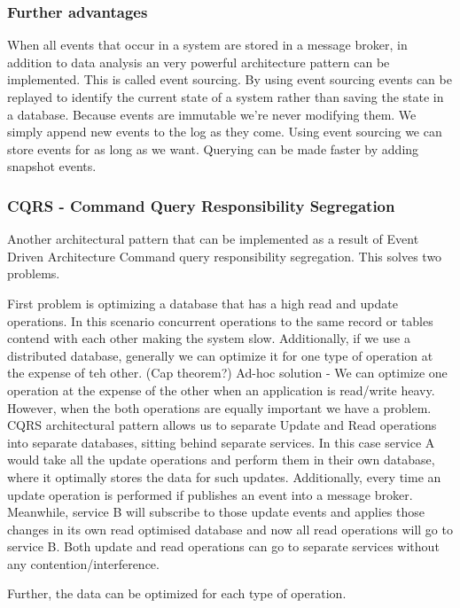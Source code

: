 \documentclass[a4paper, 11pt]{book}
\begin{document}
    \subsubsection{Further advantages}
    When all events that occur in a system are stored in a message broker, in addition to data analysis an very powerful architecture pattern can be implemented.
    This is called event sourcing.
    By using event sourcing events can be replayed to identify the current state of a system rather than saving the state in a database.
    Because events are immutable we're never modifying them.
    We simply append new events to the log as they come.
    Using event sourcing we can store events for as long as we want.
    Querying can be made faster by adding snapshot events.

    \subsubsection{CQRS - Command Query Responsibility Segregation}
    Another architectural pattern that can be implemented as a result of Event Driven Architecture
    Command query responsibility segregation.
    This solves two problems.

    First problem is optimizing a database that has a high read and update operations.
    In this scenario concurrent operations to the same record or tables contend with each other making the system slow.
    Additionally, if we use a distributed database, generally we can optimize it for one type of operation at the expense of teh other.
    (Cap theorem?)
    Ad-hoc solution - We can optimize one operation at the expense of the other when an application is read/write heavy.
    However, when the both operations are equally important we have a problem.
    CQRS architectural pattern allows us to separate Update and Read operations into separate databases, sitting behind separate services.
    In this case service A would take all the update operations and perform them in their own database, where it optimally stores the data for such updates.
    Additionally, every time an update operation is performed if publishes an event into a message broker.
    Meanwhile, service B will subscribe to those update events and applies those changes in its own read optimised database and now all read operations will go to service B.
    Both update and read operations can go to separate services without any contention/interference.

    Further, the data can be optimized for each type of operation.
\end{document}
